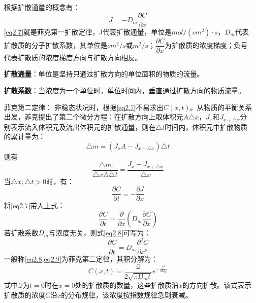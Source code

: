 \documentclass[UTF8]{ctexart}
\theoremstyle{plain}
\begin{document}
根据扩散通量的概念有：
\begin{equation}
    J = -D_m\dfrac{\partial C}{ \partial x}
    \label{eq2.7}
\end{equation}
\cref{eq2.7}就是\textcolor[rgb]{1,0,0}{菲克第一扩散定律}，J代表扩散通量，单位是$mol/(cm^2)\cdot s$，$D_m$代表扩散质的分子扩散系数，其单位是$cm^2/s$或$m^2/s$；$\dfrac{\partial C}{\partial x}$为扩散质的浓度梯度；负号代表扩散质的浓度梯度方向与扩散方向相反。

\textbf{\textcolor[rgb]{1,0,0}{扩散通量}}：单位是坚持只通过扩散方向的单位面积的物质的流量。

\textbf{\textcolor[rgb]{1,0,0}{扩散系数}}：当浓度为一个单位时，单位时间内，垂直通过扩散方向的物质流量。

\textcolor[rgb]{1,0,0}{菲克第二定律}：
非稳态状况时，根据\cref{eq2.7}不易求出$C(x,t)$。从物质的平衡关系出发，菲克提出了第二个微分方程：在扩散方向上取体积元$A\triangle x$，$J_x$和$J_{x+\triangle x}$分别表示流入体积元及流出体积元的扩散通量，则在$\triangle t$时间内，体积元中扩散物质的累计量为：
\begin{equation*}
    \triangle m = (J_xA - J_{x+\triangle x})\triangle t
\end{equation*}
则有
\begin{equation*}
    \dfrac{\triangle m}{\triangle x A \triangle t} = \dfrac{J_x-J_{x+\triangle x}}{\triangle x}
\end{equation*}
当$\triangle x, \triangle t>0$时，有：
\begin{equation*}
    \dfrac{\partial C}{\partial t} = -\dfrac{\partial J}{\partial x}
\end{equation*}
将\cref{eq2.7}带入上式：
\begin{equation}
    \dfrac{\partial C}{\partial t} = \dfrac{\partial}{\partial x}\left(D_m \dfrac{\partial C}{\partial x}\right)
    \label{eq2.8}
\end{equation}
若扩散系数$D_m$与浓度无关，则式\cref{eq2.8}可写为：
\begin{equation}
    \dfrac{\partial C}{\partial t} = D_m \dfrac{\partial^2C}{\partial x^2}
    \label{eq2.9}
\end{equation}
一般称\cref{eq2.8,eq2.9}为菲克第二定律，其积分解为：
\begin{equation}
    C(x,t) = \dfrac{\mathcal{Q}}{2\sqrt{\pi D_m t}} e^{-\frac{x^2}{4D_m}}
    \label{eq2.10}
\end{equation}
式中$\mathcal{Q}$为$t=0$时在$x=0$处的扩散质的数量，这些扩散质沿$x$的方向扩散。该式表示扩散质的浓度$C$沿$x$的分布规律，该浓度按指数规律急剧衰减。
\end{document}
